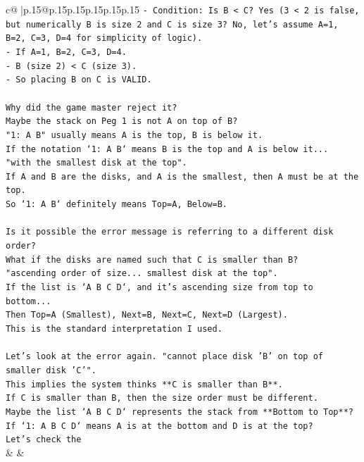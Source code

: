 \documentclass{article}
\begin{document}
{\begin{supertabular}{c@{$\;$}|p{.15\linewidth}@{}p{.15\linewidth}p{.15\linewidth}p{.15\linewidth}p{.15\linewidth}p{.15\linewidth}}
{{{\texttt{{-} Condition: Is B < C? Yes (3 < 2 is false, but numerically B is size 2 and C is size 3? No, let's assume A=1, B=2, C=3, D=4 for simplicity of logic).} \\
\texttt{{-} If A=1, B=2, C=3, D=4.} \\
\texttt{{-} B (size 2) < C (size 3).} \\
\texttt{{-} So placing B on C is VALID.} \\
\\ 
\texttt{Why did the game master reject it?} \\
\texttt{Maybe the stack on Peg 1 is not A on top of B?} \\
\texttt{"1: A B" usually means A is the top, B is below it.} \\
\texttt{If the notation `1: A B` means B is the top and A is below it...} \\
\texttt{"with the smallest disk at the top".} \\
\texttt{If A and B are the disks, and A is the smallest, then A must be at the top.} \\
\texttt{So `1: A B` definitely means Top=A, Below=B.} \\
\\ 
\texttt{Is it possible the error message is referring to a different disk order?} \\
\texttt{What if the disks are named such that C is smaller than B?} \\
\texttt{"ascending order of size... smallest disk at the top".} \\
\texttt{If the list is `A B C D`, and it's ascending size from top to bottom...} \\
\texttt{Then Top=A (Smallest), Next=B, Next=C, Next=D (Largest).} \\
\texttt{This is the standard interpretation I used.} \\
\\ 
\texttt{Let's look at the error again. "cannot place disk 'B' on top of smaller disk 'C'".} \\
\texttt{This implies the system thinks **C is smaller than B**.} \\
\texttt{If C is smaller than B, then the size order must be different.} \\
\texttt{Maybe the list `A B C D` represents the stack from **Bottom to Top**?} \\
\texttt{If `1: A B C D` means A is at the bottom and D is at the top?} \\
\texttt{Let's check the} \\
            }
        }
    }
    & & \\ \\


\end{supertabular}}
\end{document}
